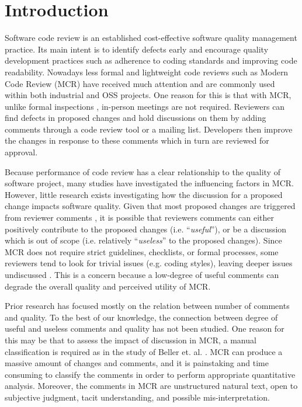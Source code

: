 
\section{Introduction}
Software code review is an established cost-effective software quality management practice.
Its main intent is to  identify  defects early and encourage quality development practices such as adherence to coding standards and improving code readability.
Nowadays less formal and lightweight code reviews such as Modern Code Review (MCR)\cite{Bacchelli2013a} have received much attention and are commonly used within both industrial and OSS projects.
One reason for this is that with MCR, unlike formal inspections \cite{Fagan:1976:DCI:1661010.1661012}, in-person meetings are not required.
Reviewers can find defects in proposed changes and hold discussions on them by adding comments through a code review tool or a mailing list.
Developers then improve the changes in response to these comments which in turn are reviewed for approval.  

Because performance of code review has a clear relationship to the quality of software project, many studies have investigated the influencing factors in MCR\cite{Baysal2001,Mcintosh,Beller,Hamasaki2013}.
However, little research exists investigating how the discussion for a proposed change impacts software quality.
Given that most proposed changes are triggered from reviewer comments \cite{Beller}, 
it is possible that reviewers comments can either positively contribute to the proposed changes (i.e. ``\emph{useful}''), or be a discussion which is out of scope (i.e. relatively  ``\emph{useless}''  to the proposed changes). 
Since MCR does not require strict guidelines, checklists, or formal processes, some reviewers tend to look for trivial issues (e.g. coding styles), leaving deeper issues undiscussed \cite{Bacchelli2013a}.
This is a concern because a low-degree of useful comments can degrade the overall quality and perceived utility of MCR.

Prior research has focused mostly on the relation between number of comments and quality.
To the best of our knowledge, the connection between degree of useful and useless comments and quality has not been studied.
One reason for this may be that to assess the impact of discussion in MCR, a manual classification is required as in the study of Beller et. al. \cite{Beller}.
MCR can produce a massive amount of changes and comments\cite{Balachandran2013,Thongtanunam2014}, and it is painstaking and time consuming to classify the comments in order to perform appropriate quantitative analysis.
Moreover, the comments in MCR are unstructured natural text, open to subjective judgment, tacit understanding, and possible mis-interpretation. 



